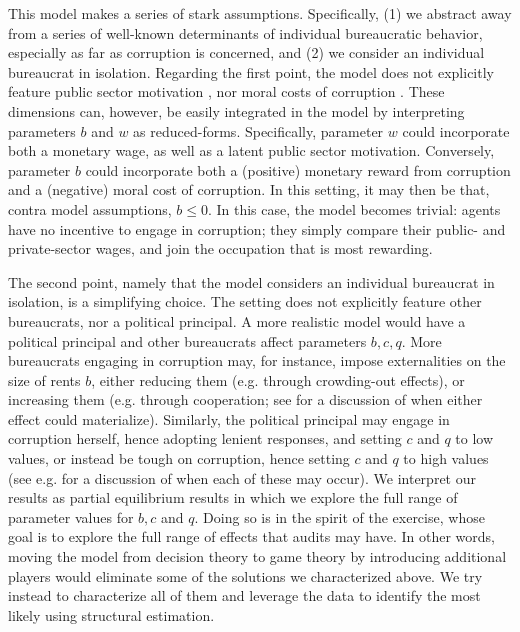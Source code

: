 \documentclass[12pt,a4paper]{article}
\theoremstyle{definition}
\begin{document}
{This model makes a series of stark assumptions. Specifically, (1) we abstract away from a series of well-known determinants of individual bureaucratic behavior, especially as far as corruption is concerned, and (2) we consider an individual bureaucrat in isolation. Regarding the first point, the model does not explicitly feature public sector motivation \citep{dal2013strengthening}, nor moral costs of corruption \citep[see e.g.][]{roseackerman1975}. These dimensions can, however, be easily integrated in the model by interpreting parameters $b$ and $w$ as reduced-forms. Specifically, parameter $w$ could incorporate both a monetary wage, as well as a latent public sector motivation. Conversely, parameter $b$ could incorporate both a (positive) monetary reward from corruption and a (negative) moral cost of corruption. In this setting, it may then be that, contra model assumptions, $b \leq 0$. In this case, the model becomes trivial: agents have no incentive to engage in corruption; they simply compare their public- and private-sector wages, and join the occupation that is most rewarding. 

The second point, namely that the model considers an individual bureaucrat in isolation, is a simplifying choice. The setting does not explicitly feature other bureaucrats, nor a political principal. A more realistic model would have a political principal and other bureaucrats affect parameters $b, c, q$. More bureaucrats engaging in corruption may, for instance, impose externalities on the size of rents $b$, either reducing them (e.g. through crowding-out effects), or increasing them (e.g. through cooperation; see \citet{shleifervishny1993corruption} for a discussion of when either effect could materialize). Similarly, the political principal may engage in corruption herself, hence adopting lenient responses, and setting $c$ and $q$ to low values, or instead be tough on corruption, hence setting $c$ and $q$ to high values (see e.g. \citet{ferraz_electoral_2011} for a discussion of when each of these may occur). We interpret our results as partial equilibrium results in which we explore the full range of parameter values for $b,c$ and $q$. Doing so is in the spirit of the exercise, whose goal is to explore the full range of effects that audits may have. In other words, moving the model from decision theory to game theory by introducing additional players would eliminate some of the solutions we characterized above. We try instead to characterize all of them and leverage the data to identify the most likely using structural estimation. 

}
\end{document}
